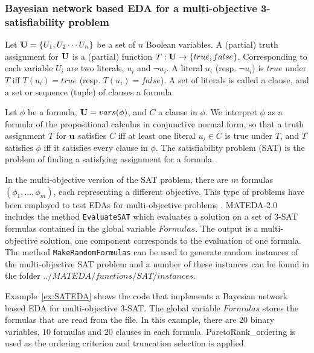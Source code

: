 \documentclass[a4paper]{article}
\begin{document}
\subsubsection{Bayesian network based EDA for a multi-objective 3-satisfiability problem}

Let ${\bf{U}} = \{U_1,U_2 \cdots U_n\}$ be a set of $n$ Boolean
variables. A (partial) truth assignment for ${\bf{U}}$ is a
(partial) function $T: {\bf{U}} \rightarrow \{true,false\}$.
Corresponding to each variable $U_i$ are two literals, $u_i$ and
$\lnot u_i$. A literal $u_i$ (resp. $\lnot u_i$) is $true$ under $T$
iff $T(u_i)=true$ (resp. $T(u_i)=false$). A set of literals is
called a clause, and a set or sequence (tuple) of clauses a formula.

Let $\phi $ be a formula, ${\bf{U}} = vars(\phi )$, and $C$ a clause
in $\phi $. We interpret $\phi $ as a formula of the propositional
calculus in conjunctive normal form, so that a truth assignment $T$
for ${\bf{u}}$ satisfies $C$ iff at least one literal $u_i \in C$ is
true under $T$, and $T$ satisfies $\phi $ iff it satisfies every
clause in $\phi $. The satisfiability problem (SAT)
\cite{Selman_et_al:1992}  is the problem of finding a satisfying
assignment for a formula.

In the multi-objective version of the SAT problem, there are $m$
formulas $(\phi_1, \dots, \phi_m)$, each representing a different objective. This type of
problems have been employed to test EDAs for multi-objective
problems \cite{Bosman:2003}. MATEDA-2.0 includes the method
\texttt{EvaluateSAT} which evaluates a solution on a set of 3-SAT
formulas contained in the global variable $Formulas$. The output is
a multi-objective solution, one component corresponds to the
evaluation of one formula. The method \texttt{MakeRandomFormulas}
can be used to generate random instances of the multi-objective SAT
problem and a number of these instances can be found in the folder
$../MATEDA/functions/SAT/instances$.

Example~\ref{ex:SATEDA} shows the code that implements a Bayesian
network based EDA  for multi-objective 3-SAT. The global variable
$Formulas$ stores the formulas that are read from the file. In this
example, there are $20$ binary variables, $10$ formulas and $20$
clauses in each formula. ParetoRank\_ordering is used as the
ordering criterion and truncation selection is applied.
\end{document}
